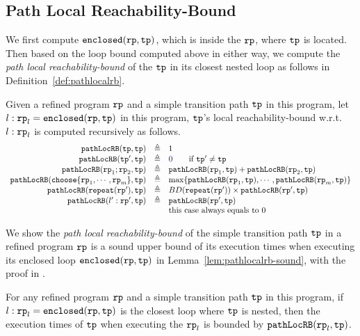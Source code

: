   \subsection{Path Local Reachability-Bound}
We first compute $\mathtt{enclosed}(\mathtt{rp}, \mathtt{tp})$, which is  inside the $\mathtt{rp}$, where $\mathtt{tp}$ is located.
Then based on the loop bound computed above in either way, we compute the \emph{path local reachability-bound} of
the $\mathtt{tp}$ in its closest nested loop as follows in Definition~\ref{def:pathlocalrb}.
\begin{defn}
    \label{def:pathlocalrb}
    Given a refined program $\mathtt{rp}$ and a simple transition path $\mathtt{tp}$ in this program, 
    let $l: \mathtt{rp}_l = \mathtt{enclosed}(\mathtt{rp}, \mathtt{tp})$ in this program,
    $\mathtt{tp}$'s local reachability-bound w.r.t. $l: \mathtt{rp}_l$
    is computed recursively as follows. 
  \[
    \begin{array}{rcl}
      \outinB(\tpath, \tpath) & \triangleq & 1 \\
      \outinB(\tpath', \tpath) & \triangleq & \highlight{0} \qquad \text{if } \tpath' \neq \tpath\\
      \outinB(\rprog_1;\rprog_2, \tpath) & \triangleq & \outinB(\rprog_1, \tpath) + \outinB(\rprog_2, \tpath) \\
      \outinB(\rpchoose{\rprog_1, \cdots, \rprog_m }, \tpath) & \triangleq 
      & \max\left\{ \outinB(\rprog_1, \tpath), \cdots, \outinB(\rprog_m, \tpath) \right\} \\
      \outinB(\rprepeat(\rprog'), \tpath) & \triangleq 
      & BD(\rprepeat(\rprog'))
       \times \outinB(\rprog', \tpath)
       \\
      \outinB(l': \rprog', \tpath) & \triangleq & \outinB(\rprog', \tpath) \\
      &  & \text{this case always equals to } 0 \\
    \end{array}
    \]
\end{defn}
We show the \emph{path local reachability-bound} of the simple transition path $\mathtt{tp}$ in a refined program $\mathtt{rp}$ is a sound upper bound of its execution times when executing its enclosed loop $\mathtt{enclosed}(\mathtt{rp}, \mathtt{tp})$ in Lemma~\ref{lem:pathlocalrb-sound}, with the proof in .
\begin{lem}
  \label{lem:pathlocalrb-sound}
  For any refined program $\mathtt{rp}$ and a simple transition path $\mathtt{tp}$ in this program,
  if $l: \mathtt{rp}_l = \mathtt{enclosed}(\mathtt{rp}, \mathtt{tp})$ is the closest loop where $\mathtt{tp}$ is nested,
  then the execution times of $\mathtt{tp}$ when executing the $\mathtt{rp}_l$ is bounded by $\mathtt{pathLocRB}(\mathtt{rp}_l, \mathtt{tp})$.
\end{lem}